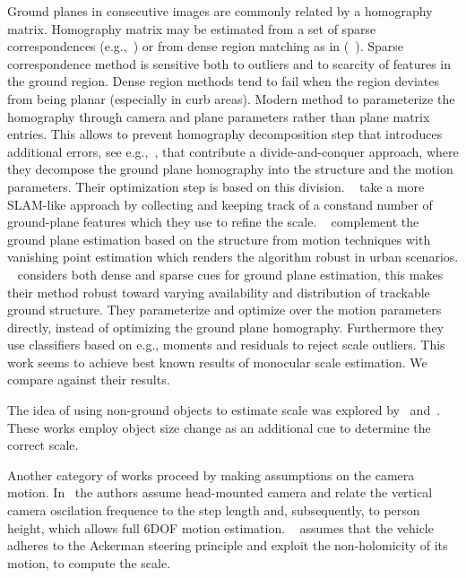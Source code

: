 Ground planes in consecutive images are commonly related by a
homography matrix. Homography matrix may be estimated from a set of
sparse correspondences (e.g.,~\cite{song2014robust}) or from dense
region matching as in (~\cite{7995955}).  Sparse correspondence method
is sensitive both to outliers and to scarcity of features in the
ground region.  Dense region methods tend to fail when the region
deviates from being planar (especially in curb areas). Modern method
to parameterize the homography through camera and plane parameters
rather than plane matrix entries.  This allows to prevent homography
decomposition step that introduces additional errors, see
e.g.,~\cite{zhou2016reliable}, that contribute a divide-and-conquer
approach, where they decompose the ground plane homography into the
structure and the motion parameters.  Their optimization step is based
on this division.  ~\cite{kitt2011monocular} take a more SLAM-like
approach by collecting and keeping track of a constand number of
ground-plane features which they use to refine the scale.
~\cite{grater2015robust} complement the ground plane estimation based
on the structure from motion techniques with vanishing point
estimation which renders the algorithm robust in urban
scenarios. ~\cite{7995955} considers both dense and sparse cues for
ground plane estimation, this makes their method robust toward varying
availability and distribution of trackable ground structure.  They
parameterize and optimize over the motion parameters directly, instead
of optimizing the ground plane homography.  Furthermore they use
classifiers based on e.g., moments and residuals to reject scale
outliers.  This work seems to achieve best known results of monocular
scale estimation.  We compare against their results.

The idea of using non-ground objects to estimate scale was explored
by~\cite{song2014robust} and~\cite{frost2016}.  These works employ
object size change as an additional cue to determine the correct scale.

Another category of works proceed by making assumptions on the camera
motion. In~\cite{gutierrez2012full} the authors assume head-mounted
camera and relate the vertical camera oscilation frequence to the step
length and, subsequently, to person height, which allows full 6DOF
motion estimation. ~\cite{scaramuzza2009absolute} assumes that the
vehicle adheres to the Ackerman steering principle and exploit the
non-holomicity of its motion, to compute the scale.

